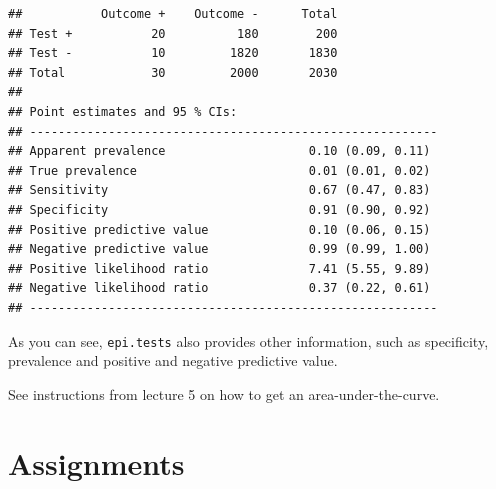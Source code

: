 \documentclass[]{book}
\begin{document}
\begin{verbatim}
##           Outcome +    Outcome -      Total
## Test +           20          180        200
## Test -           10         1820       1830
## Total            30         2000       2030
## 
## Point estimates and 95 % CIs:
## ---------------------------------------------------------
## Apparent prevalence                    0.10 (0.09, 0.11)
## True prevalence                        0.01 (0.01, 0.02)
## Sensitivity                            0.67 (0.47, 0.83)
## Specificity                            0.91 (0.90, 0.92)
## Positive predictive value              0.10 (0.06, 0.15)
## Negative predictive value              0.99 (0.99, 1.00)
## Positive likelihood ratio              7.41 (5.55, 9.89)
## Negative likelihood ratio              0.37 (0.22, 0.61)
## ---------------------------------------------------------
\end{verbatim}

As you can see, \texttt{epi.tests} also provides other information, such as specificity, prevalence and positive and negative predictive value.

See instructions from lecture 5 on how to get an area-under-the-curve.

\hypertarget{assignments-5}{%
\section{Assignments}\label{assignments-5}}
\end{document}
